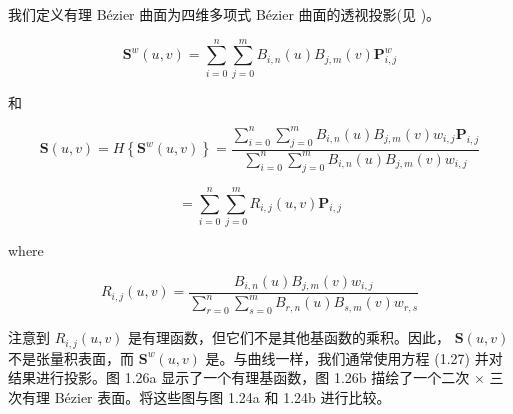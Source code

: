 \documentclass[../main.tex]{subfiles}
\begin{document}
我们定义有理 Bézier 曲面为四维多项式 Bézier 曲面的透视投影(见 \cite{Pieg86,Fari89})。

\[
{\mathbf{S}}^{w}\left( {u,v}\right)  = \mathop{\sum }\limits_{{i = 0}}^{n}\mathop{\sum }\limits_{{j = 0}}^{m}{B}_{i,n}\left( u\right) {B}_{j,m}\left( v\right) {\mathbf{P}}_{i,j}^{w} \tag{1.27}
\]

和

\[
\mathbf{S}\left( {u,v}\right)  = H\left\{  {{\mathbf{S}}^{w}\left( {u,v}\right) }\right\}   = \frac{\mathop{\sum }\limits_{{i = 0}}^{n}\mathop{\sum }\limits_{{j = 0}}^{m}{B}_{i,n}\left( u\right) {B}_{j,m}\left( v\right) {w}_{i,j}{\mathbf{P}}_{i,j}}{\mathop{\sum }\limits_{{i = 0}}^{n}\mathop{\sum }\limits_{{j = 0}}^{m}{B}_{i,n}\left( u\right) {B}_{j,m}\left( v\right) {w}_{i,j}}
\]

\[
= \mathop{\sum }\limits_{{i = 0}}^{n}\mathop{\sum }\limits_{{j = 0}}^{m}{R}_{i,j}\left( {u,v}\right) {\mathbf{P}}_{i,j} \tag{1.28}
\]

where

\[
{R}_{i,j}\left( {u,v}\right)  = \frac{{B}_{i,n}\left( u\right) {B}_{j,m}\left( v\right) {w}_{i,j}}{\mathop{\sum }\limits_{{r = 0}}^{n}\mathop{\sum }\limits_{{s = 0}}^{m}{B}_{r,n}\left( u\right) {B}_{s,m}\left( v\right) {w}_{r,s}}
\]

\noindent\begin{minipage}{\linewidth}
注意到 \({R}_{i,j}\left( {u,v}\right)\) 是有理函数，但它们不是其他基函数的乘积。因此， \(\mathbf{S}\left( {u,v}\right)\) 不是张量积表面，而 \({\mathbf{S}}^{w}\left( {u,v}\right)\) 是。与曲线一样，我们通常使用方程 (1.27) 并对结果进行投影。图 1.26a 显示了一个有理基函数，图 1.26b 描绘了一个二次 \(\times\) 三次有理 Bézier 表面。将这些图与图 1.24a 和 1.24b 进行比较。
\begin{center}
\begin{minipage}{24.6cm}
\centering
\begin{minipage}[t]{12cm}\centering
{}
\end{minipage}\hspace{.6cm}%
\begin{minipage}[t]{12cm}\centering
{}
\end{minipage}
\captionsetup{font=small,skip=6pt,justification=centering}
\end{minipage}
\end{center}
\end{minipage}
\par\medskip
\end{document}
